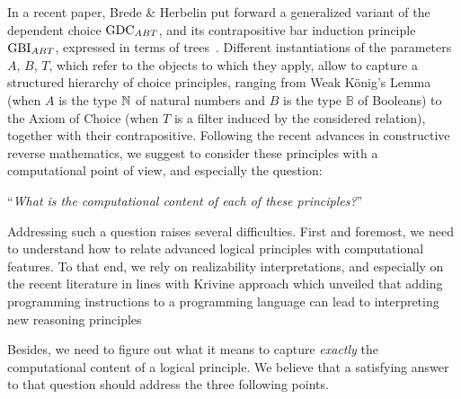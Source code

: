 \documentclass[a4paper,UKenglish,cleveref, autoref, thm-restate]{lipics-v2021}
\begin{document}
In a recent paper, Brede \& Herbelin put forward a generalized variant of the dependent choice $\mathrm{GDC}_{ABT}$, and its contrapositive bar induction principle $\mathrm{GBI}_{ABT}$, expressed in terms of trees~\cite{BreHer21}.
Different instantiations of the parameters $A$, $B$, $T$, which refer to the objects to which they apply, allow to capture
a structured hierarchy of choice principles, ranging from Weak K\"onig's Lemma
(when $A$ is the type $\mathbb N$ of natural numbers and $B$ is the type $\mathbb{B}$ of Booleans)
to the Axiom of Choice
(when $T$ is a filter induced by the considered relation), together with their contrapositive.
Following the recent advances in constructive reverse mathematics, we suggest to consider these principles with a computational point of view, and especially the question:
\begin{center}
 ``\emph{What is the computational content of each of these principles?}''
\end{center}







Addressing such a question raises several difficulties.
First and foremost, we need to understand how to relate advanced logical principles with computational features.
To that end, we rely on realizability interpretations, and especially on the recent literature in lines with Krivine approach which unveiled that adding programming instructions to a programming language can lead to interpreting new reasoning principles~\cite{Griffin90,Krivine04,Miquel11,Miquey18a,Geoffroy18,CohFarTat19,Blot22}

Besides, we need to figure out what it means to  capture \emph{exactly} the computational content of a logical principle. We believe that a satisfying answer to that question should address the three following points.
\end{document}
